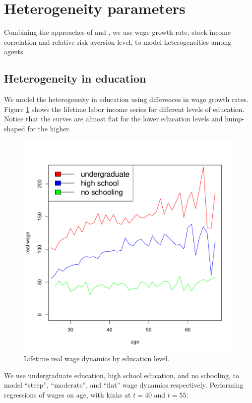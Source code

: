 \section{Heterogeneity parameters}
Combining the approaches of \citet{olear} and \citet{munk}, we use wage growth rate, stock-income correlation and relative risk aversion level, to model heterogeneities among agents.

\subsection{Heterogeneity in education}
We model the heterogeneity in education using differences in wage growth rates. Figure \ref{fig:wageeduc} shows the lifetime labor income series for different levels of education. Notice that the curves are almost flat for the lower education levels and hump-shaped for the higher.

\begin{figure}[h]
	\centering
	\includegraphics[scale=0.4]{figs/wage2educ.pdf}
	\caption{Lifetime real wage dynamics by education level.}
	\label{fig:wageeduc}
\end{figure}

We use undergraduate education, high school education, and no schooling, to model ``steep'', ``moderate'', and ``flat'' wage dynamics respectively. Performing regressions of wages on age, with kinks at $t=40$ and $t=55$:

